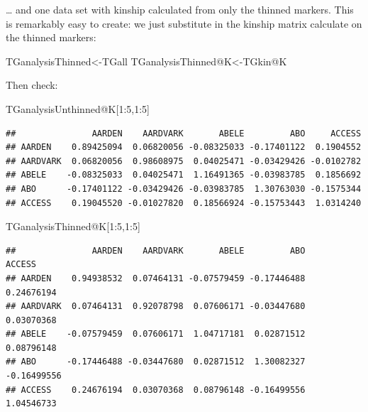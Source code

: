 \documentclass[
]{book}
\newenvironment{Shaded}{\begin{snugshade}}{\end{snugshade}}
\newcommand{\DecValTok}[1]{\textcolor[rgb]{0.00,0.00,0.81}{#1}}
\newcommand{\NormalTok}[1]{#1}
\newcommand{\OtherTok}[1]{\textcolor[rgb]{0.56,0.35,0.01}{#1}}
\newcommand{\SpecialCharTok}[1]{\textcolor[rgb]{0.00,0.00,0.00}{#1}}
\begin{document}
\ldots{} and one data set with kinship calculated from only the thinned markers. This is remarkably easy to create: we just substitute in the kinship matrix calculate on the thinned markers:

\begin{Shaded}
\begin{Highlighting}[]
\NormalTok{TGanalysisThinned}\OtherTok{\textless{}{-}}\NormalTok{TGall}
\NormalTok{TGanalysisThinned}\SpecialCharTok{@}\NormalTok{K}\OtherTok{\textless{}{-}}\NormalTok{TGkin}\SpecialCharTok{@}\NormalTok{K }
\end{Highlighting}
\end{Shaded}

Then check:

\begin{Shaded}
\begin{Highlighting}[]
\NormalTok{TGanalysisUnthinned}\SpecialCharTok{@}\NormalTok{K[}\DecValTok{1}\SpecialCharTok{:}\DecValTok{5}\NormalTok{,}\DecValTok{1}\SpecialCharTok{:}\DecValTok{5}\NormalTok{] }
\end{Highlighting}
\end{Shaded}

\begin{verbatim}
##               AARDEN    AARDVARK       ABELE         ABO     ACCESS
## AARDEN    0.89425094  0.06820056 -0.08325033 -0.17401122  0.1904552
## AARDVARK  0.06820056  0.98608975  0.04025471 -0.03429426 -0.0102782
## ABELE    -0.08325033  0.04025471  1.16491365 -0.03983785  0.1856692
## ABO      -0.17401122 -0.03429426 -0.03983785  1.30763030 -0.1575344
## ACCESS    0.19045520 -0.01027820  0.18566924 -0.15753443  1.0314240
\end{verbatim}

\begin{Shaded}
\begin{Highlighting}[]
\NormalTok{TGanalysisThinned}\SpecialCharTok{@}\NormalTok{K[}\DecValTok{1}\SpecialCharTok{:}\DecValTok{5}\NormalTok{,}\DecValTok{1}\SpecialCharTok{:}\DecValTok{5}\NormalTok{] }
\end{Highlighting}
\end{Shaded}

\begin{verbatim}
##               AARDEN    AARDVARK       ABELE         ABO      ACCESS
## AARDEN    0.94938532  0.07464131 -0.07579459 -0.17446488  0.24676194
## AARDVARK  0.07464131  0.92078798  0.07606171 -0.03447680  0.03070368
## ABELE    -0.07579459  0.07606171  1.04717181  0.02871512  0.08796148
## ABO      -0.17446488 -0.03447680  0.02871512  1.30082327 -0.16499556
## ACCESS    0.24676194  0.03070368  0.08796148 -0.16499556  1.04546733
\end{verbatim}
\end{document}
